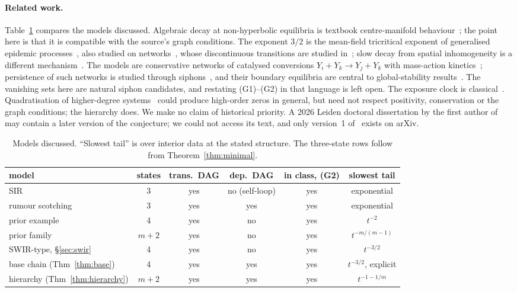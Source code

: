 \documentclass[11pt,a4paper]{article}
\theoremstyle{definition}\newtheorem{definition}[theorem]{Definition}
\theoremstyle{remark}\newtheorem{remark}[theorem]{Remark}
\begin{document}
\paragraph{Related work.}
Table~\ref{tab:lit} compares the models discussed. Algebraic decay at
non-hyperbolic equilibria is textbook centre-manifold
behaviour~\cite{Carr}; the point here is that it is compatible with the
source's graph conditions. The exponent $3/2$ is the mean-field
tricritical exponent of generalised epidemic
processes~\cite{Grassberger1983,Janssen,JanssenStenull}, also studied on
networks~\cite{Chung}, whose
discontinuous transitions are studied
in~\cite{DoddsWatts,Bizhani,ChenCoinfection,ChoiLeeKahng}; slow decay
from spatial inhomogeneity is a different
mechanism~\cite{SakaguchiNakao}. The models are conservative networks
of catalysed conversions $Y_i+Y_k\to Y_j+Y_k$ with mass-action
kinetics~\cite{HornJackson,Feinberg}; persistence of such networks is
studied through siphons~\cite{AngeliSontag}, and their boundary
equilibria are central to global-stability
results~\cite{Anderson}. The vanishing sets here are natural siphon
candidates, and restating (G1)--(G2) in that language is left open. The
exposure clock is classical~\cite{KermackMcKendrick,Arruda,Rada}.
Quadratisation of higher-degree systems~\cite{BychkovPogudin} could
produce high-order zeros in general, but need not respect positivity,
conservation or the graph conditions; the hierarchy does.
We make no claim of historical priority. A 2026 Leiden doctoral
dissertation by the first author of~\cite{CCM} may contain a later
version of the conjecture; we could not access its text, and only
version~1 of~\cite{CCM} exists on arXiv.

\begin{table}[ht]
\centering\small
\begin{tabular}{lccccc}
\toprule
model & states & trans.\ DAG & dep.\ DAG & in class, (G2) & slowest tail\\
\midrule
SIR~\cite{KermackMcKendrick} & 3 & yes & no (self-loop) & yes & exponential\\
rumour scotching~\cite{Arruda} & 3 & yes & yes & yes & exponential\\
prior example~\cite{EPprior} & 4 & yes & no & yes & $t^{-2}$\\
prior family~\cite{EPprior} & $m+2$ & yes & no & yes & $t^{-m/(m-1)}$\\
SWIR-type, \S\ref{sec:swir} & 4 & yes & no & yes & $t^{-3/2}$\\
base chain (Thm~\ref{thm:base}) & 4 & yes & yes & yes & $t^{-3/2}$, explicit\\
hierarchy (Thm~\ref{thm:hierarchy}) & $m+2$ & yes & yes & yes & $t^{-1-1/m}$\\
\bottomrule
\end{tabular}
\caption{Models discussed. ``Slowest tail'' is over interior data at
the stated structure. The three-state rows follow from
Theorem~\ref{thm:minimal}.}
\label{tab:lit}
\end{table}
\end{document}
